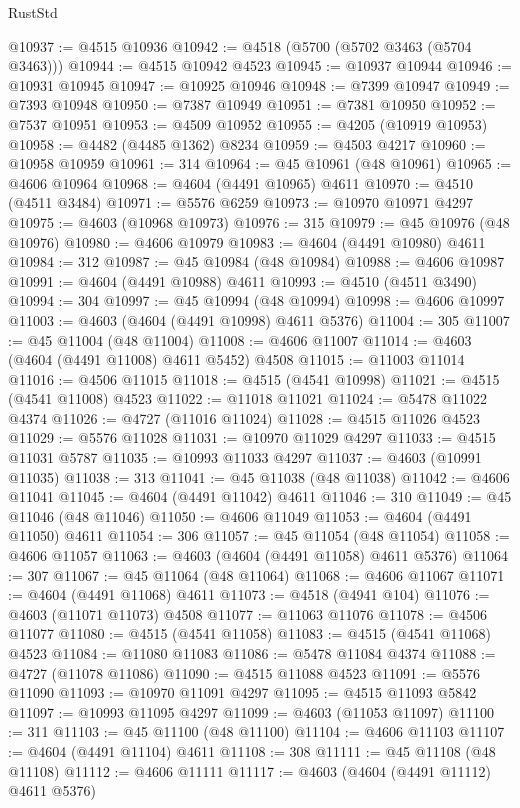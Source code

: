 \begin{lexlean}{RustStd}
\begin{coremodule}
@10937 := @4515 @10936
@10942 := @4518 (@5700 (@5702 @3463 (@5704 @3463)))
@10944 := @4515 @10942 @4523
@10945 := @10937 @10944
@10946 := @10931 @10945
@10947 := @10925 @10946
@10948 := @7399 @10947
@10949 := @7393 @10948
@10950 := @7387 @10949
@10951 := @7381 @10950
@10952 := @7537 @10951
@10953 := @4509 @10952
@10955 := @4205 (@10919 @10953)
@10958 := @4482 (@4485 @1362) @8234
@10959 := @4503 @4217
@10960 := @10958 @10959
@10961 := 314
@10964 := @45 @10961 (@48 @10961)
@10965 := @4606 @10964
@10968 := @4604 (@4491 @10965) @4611
@10970 := @4510 (@4511 @3484)
@10971 := @5576 @6259
@10973 := @10970 @10971 @4297
@10975 := @4603 (@10968 @10973)
@10976 := 315
@10979 := @45 @10976 (@48 @10976)
@10980 := @4606 @10979
@10983 := @4604 (@4491 @10980) @4611
@10984 := 312
@10987 := @45 @10984 (@48 @10984)
@10988 := @4606 @10987
@10991 := @4604 (@4491 @10988) @4611
@10993 := @4510 (@4511 @3490)
@10994 := 304
@10997 := @45 @10994 (@48 @10994)
@10998 := @4606 @10997
@11003 := @4603 (@4604 (@4491 @10998) @4611 @5376)
@11004 := 305
@11007 := @45 @11004 (@48 @11004)
@11008 := @4606 @11007
@11014 := @4603 (@4604 (@4491 @11008) @4611 @5452) @4508
@11015 := @11003 @11014
@11016 := @4506 @11015
@11018 := @4515 (@4541 @10998)
@11021 := @4515 (@4541 @11008) @4523
@11022 := @11018 @11021
@11024 := @5478 @11022 @4374
@11026 := @4727 (@11016 @11024)
@11028 := @4515 @11026 @4523
@11029 := @5576 @11028
@11031 := @10970 @11029 @4297
@11033 := @4515 @11031 @5787
@11035 := @10993 @11033 @4297
@11037 := @4603 (@10991 @11035)
@11038 := 313
@11041 := @45 @11038 (@48 @11038)
@11042 := @4606 @11041
@11045 := @4604 (@4491 @11042) @4611
@11046 := 310
@11049 := @45 @11046 (@48 @11046)
@11050 := @4606 @11049
@11053 := @4604 (@4491 @11050) @4611
@11054 := 306
@11057 := @45 @11054 (@48 @11054)
@11058 := @4606 @11057
@11063 := @4603 (@4604 (@4491 @11058) @4611 @5376)
@11064 := 307
@11067 := @45 @11064 (@48 @11064)
@11068 := @4606 @11067
@11071 := @4604 (@4491 @11068) @4611
@11073 := @4518 (@4941 @104)
@11076 := @4603 (@11071 @11073) @4508
@11077 := @11063 @11076
@11078 := @4506 @11077
@11080 := @4515 (@4541 @11058)
@11083 := @4515 (@4541 @11068) @4523
@11084 := @11080 @11083
@11086 := @5478 @11084 @4374
@11088 := @4727 (@11078 @11086)
@11090 := @4515 @11088 @4523
@11091 := @5576 @11090
@11093 := @10970 @11091 @4297
@11095 := @4515 @11093 @5842
@11097 := @10993 @11095 @4297
@11099 := @4603 (@11053 @11097)
@11100 := 311
@11103 := @45 @11100 (@48 @11100)
@11104 := @4606 @11103
@11107 := @4604 (@4491 @11104) @4611
@11108 := 308
@11111 := @45 @11108 (@48 @11108)
@11112 := @4606 @11111
@11117 := @4603 (@4604 (@4491 @11112) @4611 @5376)

\end{coremodule}
\end{lexlean}
